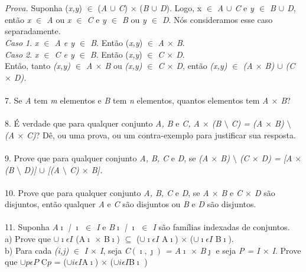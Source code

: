 \\
\\
\textit{Prova.} Suponha (\textit{x,y}) $\in$ (\textit{A $\cup$ C}) $\times$ (\textit{B $\cup$ D}). Logo, x $\in$ \textit{A $\cup$ C} e \textit{y $\in$ B $\cup$ D}, então \textit{x $\in$ A} ou \textit{x $\in$ C} e \textit{y $\in$ B} ou \textit{y $\in$ D}. Nós consideramos esse caso separadamente.
\\
\indent \textit{Caso 1}. \textit{x $\in$ A e y $\in$ B}. Então (\textit{x,y}) $\in$ \textit{A $\times$ B}.
\\
\indent  \textit{Caso 2}. \textit{x $\in$ C e y $\in$ B}. Então (\textit{x,y}) $\in$ \textit{C $\times$ D}.
\\
Então, tanto \textit{(x,y) $\in$ A $\times$ B} ou \textit{(x,y) $\in$ C $\times$ D}, então \textit{(x,y) $\in$ (A $\times$ B) $\cup$ (C $\times$ D).}
\\
\\
7. Se \textit{A} tem \textit{m} elementos e \textit{B} tem \textit{n} elementos, quantos elementos tem \textit{A $\times$ B}?
\\
\\
8. É verdade que para qualquer conjunto \textit{A, B} e \textit{C, A $\times$ (B $\setminus$ C) = (A $\times$ B) $\setminus$ (A $\times$ C)}? Dê, ou uma prova, ou um contra-exemplo para justificar sua resposta.
\\
\\
9. Prove que para qualquer conjunto \textit{A, B, C} e \textit{D}, se \textit{(A $\times$ B) $\setminus$ (C $\times$ D) = [A $\times$ (B $\setminus$ D)] $\cup$ [(A $\setminus$ C) $\times$ B].}
\\
\\
10. Prove que para qualquer conjunto \textit{A, B, C} e \textit{D}, se \textit{A $\times$ B} e \textit{C $\times$ D} são disjuntos, então qualquer \textit{A} e \textit{C} são disjuntos ou \textit{B} e \textit{D} são disjuntos.
\\
\\
11. Suponha {\textit{A$\imath$  | $\imath$ $\in$ I}} e {\textit{B$\imath$ | $\imath$ $\in$ I}} são famílias indexadas de conjuntos.
\\ \indent a) Prove que $\cup \imath \epsilon I$ (A$\imath$ $\times$ B$\imath$) $\subseteq$ ($\cup \imath \epsilon I$ A$\imath$) $\times$ ($\cup \imath \epsilon I$ B$\imath$).
\\ \indent b) Para cada \textit{(i,j)} $\in$ \textit{I $\times$ I}, seja \textit{ C$( \imath, \jmath)$  =  A$\imath$ $\times$ B$\jmath$} e seja \textit{P = I $\times$ I}. Prove que $\cup p \epsilon P$ C$p$  = ($\cup i \epsilon I$A$\imath$) $\times$ ($\cup i \epsilon I$B$\imath$ )   
